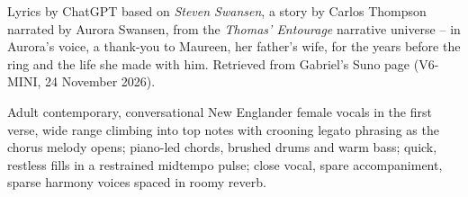 
\begin{notes}
Lyrics by ChatGPT based on \emph{Steven Swansen}, a story by Carlos Thompson narrated by Aurora Swansen, from the \emph{Thomas' Entourage} narrative universe -- in Aurora's voice, a thank-you to Maureen, her father's wife, for the years before the ring and the life she made with him. Retrieved from Gabriel's Suno page (V6-MINI, 24 November 2026).
\end{notes}
\begin{style}
Adult contemporary, conversational New Englander female vocals in the first verse, wide range climbing into top notes with crooning legato phrasing as the chorus melody opens; piano-led chords, brushed drums and warm bass; quick, restless fills in a restrained midtempo pulse; close vocal, spare accompaniment, sparse harmony voices spaced in roomy reverb.
\end{style}
